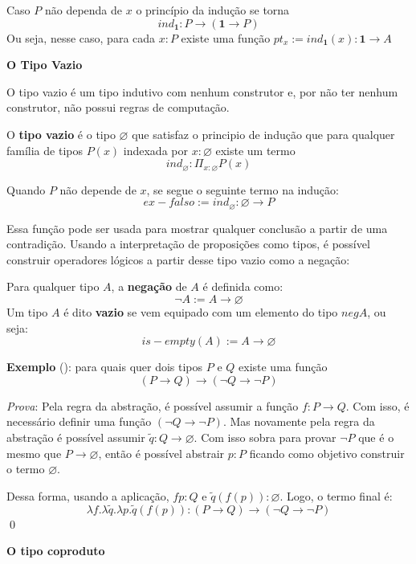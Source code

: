 \documentclass[../main.tex]{subfiles}
\begin{document}
Caso $P$ não dependa de $x$ o princípio da indução se torna $$ind_{\mathbf{1}} : P \to (\mathbf{1} \to P)$$ Ou seja, nesse caso, para cada $x : P$ existe uma função $pt_x := ind_{\mathbf{1}}(x) : \mathbf{1} \to A$

\textbf{O Tipo Vazio}

O tipo vazio é um tipo indutivo com nenhum construtor e, por não ter nenhum construtor, não possui regras de computação.

\begin{definition}
    O \textbf{tipo vazio} é o tipo $\varnothing$ que satisfaz o principio de indução que para qualquer família de tipos $P(x)$ indexada por $x : \varnothing$ existe um termo $$ind_{\varnothing} : \Pi_{x : \varnothing} P(x)$$
\end{definition}

Quando $P$ não depende de $x$, se segue o seguinte termo na indução: $$ex-falso := ind_{\varnothing} : \varnothing \to P$$

Essa função pode ser usada para mostrar qualquer conclusão a partir de uma contradição. Usando a interpretação de proposições como tipos, é possível construir operadores lógicos a partir desse tipo vazio como a negação:

\begin{definition}
    Para qualquer tipo $A$, a \textbf{negação} de $A$ é definida como:
    $$\neg A := A \to \varnothing$$
    Um tipo $A$ é dito \textbf{vazio} se vem equipado com um elemento do tipo $neg A$, ou seja:
    $$is-empty(A) := A \to \varnothing$$
\end{definition}

\textbf{Exemplo} (\cite{rijke2022}): para quais quer dois tipos $P$ e $Q$ existe uma função $$(P \to Q) \to (\neg Q \to \neg P)$$

\emph{Prova}: Pela regra da abstração, é possível assumir a função $f: P \to Q$. Com isso, é necessário definir uma função $(\neg Q \to \neg P)$. Mas novamente pela regra da abstração é possível assumir $\tilde{q} : Q \to \varnothing$. Com isso sobra para provar $\neg P$ que é o mesmo que $P \to \varnothing$, então é possível abstrair $p : P$ ficando como objetivo construir o termo $\varnothing$.

Dessa forma, usando a aplicação, $f p : Q$ e $\tilde{q} (f(p)) : \varnothing$. Logo, o termo final é: $$\lambda f. \lambda \tilde{q} . \lambda p . \tilde{q}(f(p)) : (P \to Q) \to (\neg Q \to \neg P)$$ \qed

\textbf{O tipo coproduto}
\end{document}
